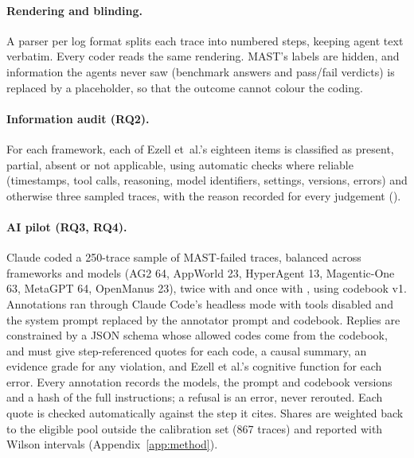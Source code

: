 \documentclass[11pt]{article}
\begin{document}
\paragraph{Rendering and blinding.} A parser per log format splits each trace into
numbered steps, keeping agent text verbatim. Every coder reads the same rendering.
MAST's labels are hidden, and information the agents never saw (benchmark answers
and pass/fail verdicts) is replaced by a placeholder, so that the outcome cannot
colour the coding.

\paragraph{Information audit (RQ2).} For each framework, each of Ezell et~al.'s
eighteen items is classified as present, partial, absent or not applicable, using
automatic checks where reliable (timestamps, tool calls, reasoning, model
identifiers, settings, versions, errors) and otherwise three sampled traces, with
the reason recorded for every judgement ().

\paragraph{AI pilot (RQ3, RQ4).} Claude coded a 250-trace sample of MAST-failed
traces, balanced across frameworks and models (AG2 64, AppWorld 23, HyperAgent 13,
Magentic-One 63, MetaGPT 64, OpenManus 23), twice with 
and once with , using codebook v1. Annotations ran through
Claude Code's headless mode with tools disabled and the system prompt replaced by
the annotator prompt and codebook. Replies are constrained by a JSON schema whose
allowed codes come from the codebook, and must give step-referenced quotes for
each code, a causal summary, an evidence grade for any violation, and Ezell et
al.'s cognitive function for each error. Every annotation records the models, the
prompt and codebook versions and a hash of the full instructions; a refusal is an
error, never rerouted. Each quote is checked automatically against the step it
cites. Shares are weighted back to the eligible pool outside the calibration set
(867 traces) and reported with Wilson
intervals (Appendix~\ref{app:method}).
\end{document}
